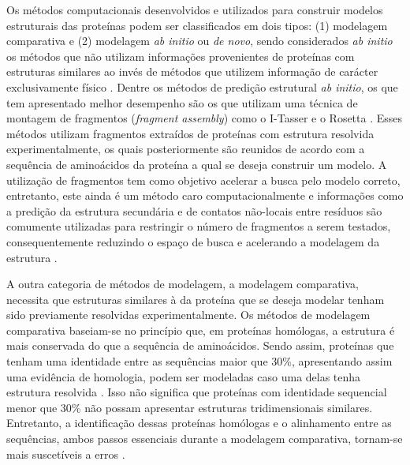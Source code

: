 Os métodos computacionais desenvolvidos e utilizados para construir modelos estruturais das proteínas podem ser classificados em dois tipos: (1) modelagem comparativa e (2) modelagem \textit{ab initio} ou \textit{de novo}, sendo considerados \textit{ab initio} os métodos que não utilizam informações provenientes de proteínas com estruturas similares ao invés de métodos que utilizem informação de carácter exclusivamente físico \cite{Helles2008}. Dentre os métodos de predição estrutural \textit{ab initio}, os que tem apresentado melhor desempenho são os que utilizam uma técnica de montagem de fragmentos (\textit{fragment assembly}) como o I-Tasser \cite{Zhang2008a} e o Rosetta \cite{Rohl2004}. Esses métodos utilizam fragmentos extraídos de proteínas com estrutura resolvida experimentalmente, os quais posteriormente são reunidos de acordo com a sequência de aminoácidos da proteína a qual se deseja construir um modelo. A utilização de fragmentos tem como objetivo acelerar a busca pelo modelo correto, entretanto, este ainda é um método caro computacionalmente e informações como a predição da estrutura secundária e de contatos não-locais entre resíduos são comumente utilizadas para restringir o número de fragmentos a serem testados, consequentemente reduzindo o espaço de busca e acelerando a modelagem da estrutura \cite{Helles2008}.

A outra categoria de métodos de modelagem, a modelagem comparativa, necessita que estruturas similares à da proteína que se deseja modelar tenham sido previamente resolvidas experimentalmente. Os métodos de modelagem comparativa baseiam-se no princípio que, em proteínas homólogas, a estrutura é mais conservada do que a sequência de aminoácidos. Sendo assim, proteínas que tenham uma identidade entre as sequências maior que 30\%, apresentando assim uma evidência de homologia, podem ser modeladas caso uma delas tenha estrutura resolvida \cite{Marti-Renom2000}. Isso não significa que proteínas com identidade sequencial menor que 30\% não possam apresentar estruturas tridimensionais similares. Entretanto, a identificação dessas proteínas homólogas e o alinhamento entre as sequências, ambos passos essenciais durante a modelagem comparativa, tornam-se mais suscetíveis a erros \cite{Marti-Renom2000}. 

